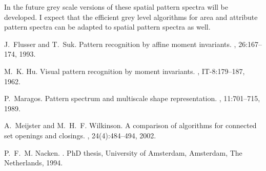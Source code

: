 \documentclass[b1]{sciposter}
\begin{document}
\begin{multicols}{2}
In the future grey scale versions of these spatial pattern spectra will be 
developed. I expect that the efficient grey level algorithms for area and
attribute pattern spectra  
\cite{Meijster:Wilkinson:PAMI}
can be adapted to spatial pattern spectra as well.
 



\begin{thebibliography}{1}

J.~Flusser and T.~Suk.
\newblock Pattern recognition by affine moment invariants.
, 26:167--174, 1993.

M.~K. Hu.
\newblock Visual pattern recognition by moment invariants.
, IT-8:179--187, 1962.

P.~Maragos.
\newblock Pattern spectrum and multiscale shape representation.
, 11:701--715, 1989.

A.~Meijster and M.~H.~F. Wilkinson.
\newblock A comparison of algorithms for connected set openings and closings.
, 24(4):484--494, 2002.

P.~F.~M. Nacken.
.
\newblock PhD thesis, University of Amsterdam, Amsterdam, The Netherlands,
  1994.

\end{thebibliography}

\end{multicols}
\end{document}
